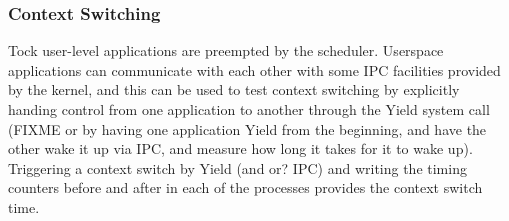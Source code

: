 \documentclass{article}
\begin{document}
\subsubsection{Context Switching}

Tock user-level applications are preempted by the scheduler. Userspace applications can communicate with each other with some IPC facilities provided by the kernel, and this can be used to test context switching by explicitly handing control from one application to another through the Yield system call (FIXME or by having one application Yield from the beginning, and have the other wake it up via IPC, and measure how long it takes for it to wake up). Triggering a context switch by Yield (and or? IPC) and writing the timing counters before and after in each of the processes provides the context switch time. 






\end{document}
